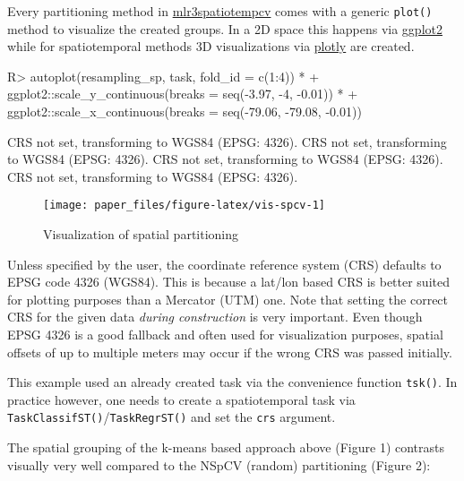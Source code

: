 \documentclass[
]{jss}
\begin{document}
Every partitioning method in
\href{https://mlr3spatiotempcv.mlr-org.com}{mlr3spatiotempcv} comes with
a generic \texttt{plot()} method to visualize the created groups. In a
2D space this happens via \href{https://ggplot2.tidyverse.org}{ggplot2}
\citep{ggplot2} while for spatiotemporal methods 3D visualizations via
\href{https://github.com/ropensci/plotly}{plotly} \citep{plotly} are
created.

\begin{CodeChunk}
\begin{CodeInput}
R> autoplot(resampling_sp, task, fold_id = c(1:4)) *
+   ggplot2::scale_y_continuous(breaks = seq(-3.97, -4, -0.01)) *
+   ggplot2::scale_x_continuous(breaks = seq(-79.06, -79.08, -0.01))
\end{CodeInput}
\begin{CodeOutput}
CRS not set, transforming to WGS84 (EPSG: 4326).
CRS not set, transforming to WGS84 (EPSG: 4326).
CRS not set, transforming to WGS84 (EPSG: 4326).
CRS not set, transforming to WGS84 (EPSG: 4326).
\end{CodeOutput}
\begin{figure}[!b]

{\centering \texttt{[image: paper\_files/figure-latex/vis-spcv-1]} 

}

\caption[Visualization of spatial partitioning]{Visualization of spatial partitioning}\label{fig:vis-spcv}
\end{figure}
\end{CodeChunk}

\hfill\break

Unless specified by the user, the coordinate reference system (CRS)
defaults to EPSG code 4326 (WGS84). This is because a lat/lon based CRS
is better suited for plotting purposes than a Mercator (UTM) one. Note
that setting the correct CRS for the given data \emph{during
construction} is very important. Even though EPSG 4326 is a good
fallback and often used for visualization purposes, spatial offsets of
up to multiple meters may occur if the wrong CRS was passed initially.

This example used an already created task via the convenience function
\texttt{tsk()}. In practice however, one needs to create a
spatiotemporal task via \texttt{TaskClassifST()}/\texttt{TaskRegrST()}
and set the \texttt{crs} argument.

The spatial grouping of the k-means based approach above (Figure 1)
contrasts visually very well compared to the NSpCV (random) partitioning
(Figure 2):
\end{document}
